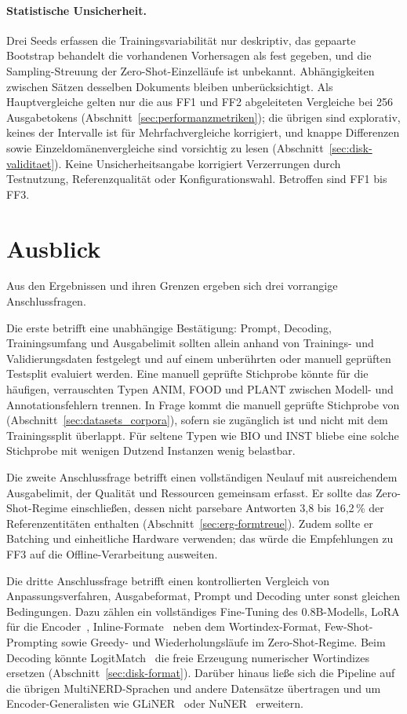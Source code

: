 \paragraph{Statistische Unsicherheit.}
Drei Seeds erfassen die Trainingsvariabilität nur deskriptiv, das
gepaarte Bootstrap behandelt die vorhandenen Vorhersagen als fest
gegeben, und die
Sampling-Streuung der Zero-Shot-Einzelläufe ist unbekannt.
Abhängigkeiten zwischen Sätzen desselben Dokuments bleiben
unberücksichtigt.
Als Hauptvergleiche gelten nur die aus FF1 und FF2 abgeleiteten
Vergleiche bei 256 Ausgabetokens (Abschnitt~\ref{sec:performanzmetriken}); die übrigen sind explorativ, keines der Intervalle ist für
Mehrfachvergleiche korrigiert, und knappe Differenzen sowie
Einzeldomänenvergleiche sind vorsichtig zu lesen
(Abschnitt~\ref{sec:disk-validitaet}).
Keine Unsicherheitsangabe korrigiert Verzerrungen durch Testnutzung,
Referenzqualität oder Konfigurationswahl.
Betroffen sind FF1 bis FF3.

\clearpage
\section{Ausblick}
\label{sec:ausblick}

Aus den Ergebnissen und ihren Grenzen ergeben sich drei vorrangige
Anschlussfragen.

Die erste betrifft eine unabhängige Bestätigung: Prompt, Decoding,
Trainingsumfang und Ausgabelimit sollten allein anhand von Trainings- und
Validierungsdaten festgelegt und auf einem unberührten oder manuell
geprüften Testsplit evaluiert werden.
Eine manuell geprüfte Stichprobe könnte für die häufigen, verrauschten
Typen ANIM, FOOD und PLANT zwischen Modell- und Annotationsfehlern
trennen.
In Frage kommt die manuell geprüfte Stichprobe von
\textcite{tedeschi2022multinerd}
(Abschnitt~\ref{sec:datasets_corpora}), sofern sie zugänglich ist und
nicht mit dem Trainingssplit überlappt.
Für seltene Typen wie BIO und INST bliebe eine solche Stichprobe mit
wenigen Dutzend Instanzen wenig belastbar.

Die zweite Anschlussfrage betrifft einen vollständigen Neulauf mit
ausreichendem Ausgabelimit, der Qualität und Ressourcen gemeinsam erfasst.
Er sollte das Zero-Shot-Regime einschließen, dessen nicht parsebare
Antworten 3,8 bis 16,2\,\% der Referenzentitäten enthalten
(Abschnitt~\ref{sec:erg-formtreue}).
Zudem sollte er Batching und einheitliche Hardware verwenden; das würde
die Empfehlungen zu FF3 auf die Offline-Verarbeitung ausweiten.

Die dritte Anschlussfrage betrifft einen kontrollierten Vergleich von
Anpassungsverfahren, Ausgabeformat, Prompt und Decoding unter sonst
gleichen Bedingungen.
Dazu zählen ein vollständiges Fine-Tuning des 0.8B-Modells, LoRA für die
Encoder~\cite{hu2021lora}, Inline-Formate~\cite{zhan2026generativeNER}
neben dem Wortindex-Format, Few-Shot-Prompting sowie Greedy- und
Wiederholungsläufe im Zero-Shot-Regime.
Beim Decoding könnte
LogitMatch~\cite[Abschn.~4]{semin2026spanLabeling} die freie Erzeugung
numerischer Wortindizes ersetzen (Abschnitt~\ref{sec:disk-format}).
Darüber hinaus ließe sich die Pipeline auf die übrigen MultiNERD-Sprachen
und andere Datensätze übertragen und um Encoder-Generalisten wie GLiNER~\cite{zaratiana2024gliner} oder NuNER~\cite{bogdanov2024nuner} erweitern.
